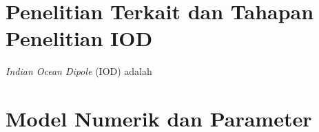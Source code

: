 \vspace{1.5pc}
\vspace{-1pc}
\section[Penelitian Terkait dan Tahapan Penelitian IOD]{Penelitian Terkait dan Tahapan Penelitian IOD}
\begin{spacing}{1.5}
	\textit{Indian Ocean Dipole} (IOD) adalah
\end{spacing}
\vspace{-1pc}
\section[Model Numerik dan Parameter]{Model Numerik dan Parameter}
